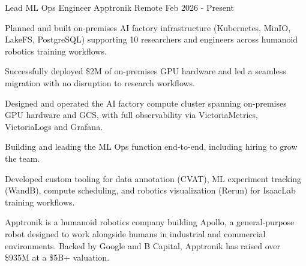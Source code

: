 
\begin{cventries}

\cventrywithsummary
{Lead ML Ops Engineer} %
{Apptronik} %
{Remote} %
{Feb 2026 - Present} %
{
  \begin{cvitems} %
    \item {Planned and built on-premises AI factory infrastructure (Kubernetes, MinIO, LakeFS, PostgreSQL) supporting 10 researchers and engineers across humanoid robotics training workflows.}
    \item {Successfully deployed \$2M of on-premises GPU hardware and led a seamless migration with no disruption to research workflows.}
    \item {Designed and operated the AI factory compute cluster spanning on-premises GPU hardware and GCS, with full observability via VictoriaMetrics, VictoriaLogs and Grafana.}
    \item {Building and leading the ML Ops function end-to-end, including hiring to grow the team.}
    \item {Developed custom tooling for data annotation (CVAT), ML experiment tracking (WandB), compute scheduling, and robotics visualization (Rerun) for IsaacLab training workflows.}
  \end{cvitems}
}
{
  Apptronik is a humanoid robotics company building Apollo, a general-purpose robot designed to work alongside humans in industrial and commercial environments. Backed by Google and B Capital, Apptronik has raised over \$935M at a \$5B+ valuation.
}


\end{cventries}

